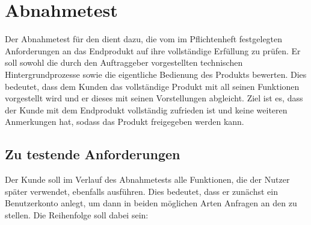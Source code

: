 
\chapter{Abnahmetest}

Der Abnahmetest für den \NewsGenie dient dazu, die vom im Pflichtenheft festgelegten Anforderungen an das Endprodukt auf ihre vollständige Erfüllung zu prüfen. 
Er soll sowohl die durch den Auftraggeber vorgestellten technischen Hintergrundprozesse sowie die eigentliche Bedienung des Produkts bewerten. 
Dies bedeutet, dass dem Kunden das vollständige Produkt mit all seinen Funktionen vorgestellt wird und er dieses mit seinen Vorstellungen abgleicht. 
Ziel ist es, dass der Kunde mit dem Endprodukt vollständig zufrieden ist und keine weiteren Anmerkungen hat, sodass das Produkt freigegeben werden kann.

\section{Zu testende Anforderungen}
\label{sec:anforderungen}

Der Kunde soll im Verlauf des Abnahmetests alle Funktionen, die der Nutzer später verwendet, ebenfalls ausführen. Dies bedeutet, dass er zunächst ein Benutzerkonto anlegt, um dann in beiden möglichen Arten Anfragen an den \NewsGenie zu stellen.
Die Reihenfolge soll dabei sein:

